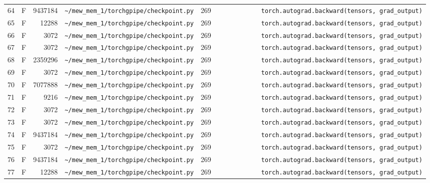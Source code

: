 \documentclass{article}
\begin{document}
\begin{longtable}{r l r p{6.5cm} r p{7.0cm}}
64 & F & 9437184 & \lstinline|~/mew_mem_1/torchgpipe/checkpoint.py| & 269 & \lstinline|            torch.autograd.backward(tensors, grad_output)| \\
65 & F & 12288 & \lstinline|~/mew_mem_1/torchgpipe/checkpoint.py| & 269 & \lstinline|            torch.autograd.backward(tensors, grad_output)| \\
66 & F & 3072 & \lstinline|~/mew_mem_1/torchgpipe/checkpoint.py| & 269 & \lstinline|            torch.autograd.backward(tensors, grad_output)| \\
67 & F & 3072 & \lstinline|~/mew_mem_1/torchgpipe/checkpoint.py| & 269 & \lstinline|            torch.autograd.backward(tensors, grad_output)| \\
68 & F & 2359296 & \lstinline|~/mew_mem_1/torchgpipe/checkpoint.py| & 269 & \lstinline|            torch.autograd.backward(tensors, grad_output)| \\
69 & F & 3072 & \lstinline|~/mew_mem_1/torchgpipe/checkpoint.py| & 269 & \lstinline|            torch.autograd.backward(tensors, grad_output)| \\
70 & F & 7077888 & \lstinline|~/mew_mem_1/torchgpipe/checkpoint.py| & 269 & \lstinline|            torch.autograd.backward(tensors, grad_output)| \\
71 & F & 9216 & \lstinline|~/mew_mem_1/torchgpipe/checkpoint.py| & 269 & \lstinline|            torch.autograd.backward(tensors, grad_output)| \\
72 & F & 3072 & \lstinline|~/mew_mem_1/torchgpipe/checkpoint.py| & 269 & \lstinline|            torch.autograd.backward(tensors, grad_output)| \\
73 & F & 3072 & \lstinline|~/mew_mem_1/torchgpipe/checkpoint.py| & 269 & \lstinline|            torch.autograd.backward(tensors, grad_output)| \\
74 & F & 9437184 & \lstinline|~/mew_mem_1/torchgpipe/checkpoint.py| & 269 & \lstinline|            torch.autograd.backward(tensors, grad_output)| \\
75 & F & 3072 & \lstinline|~/mew_mem_1/torchgpipe/checkpoint.py| & 269 & \lstinline|            torch.autograd.backward(tensors, grad_output)| \\
76 & F & 9437184 & \lstinline|~/mew_mem_1/torchgpipe/checkpoint.py| & 269 & \lstinline|            torch.autograd.backward(tensors, grad_output)| \\
77 & F & 12288 & \lstinline|~/mew_mem_1/torchgpipe/checkpoint.py| & 269 & \lstinline|            torch.autograd.backward(tensors, grad_output)| \\

\end{longtable}
\end{document}
